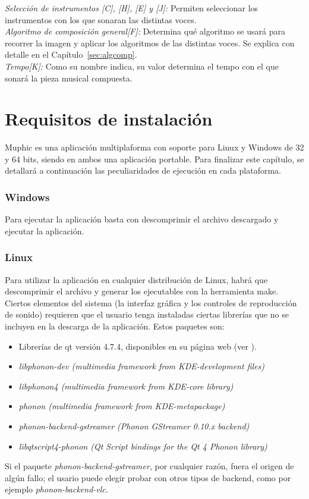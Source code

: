 		\noindent\textit{Selección de instrumentos [C], [H], [E] y [J]:} Permiten seleccionar los instrumentos con los que sonaran las distintas voces.\\

		\noindent\textit{Algoritmo de composición general[F]:} Determina qué algoritmo se usará para recorrer la imagen y aplicar los algoritmos de las distintas voces. Se explica con detalle en el Capítulo~\ref{sec:algcomp}.\\

		\noindent\textit{Tempo[K]:} Como su nombre indica, su valor determina el tempo con el que sonará la pieza musical compuesta.\\
		
	\section{Requisitos de instalación}
	
		Muphic es una aplicación multiplaforma con soporte para Linux y Windows de 32 y 64 bits, siendo en ambos una aplicación portable. Para finalizar este capítulo, se detallará a continuación las peculiaridades de ejecución en cada plataforma.
		
		\subsubsection{Windows}
		
		Para ejecutar la aplicación basta con descomprimir el archivo descargado y ejecutar la aplicación.
		
		\subsubsection{Linux}
		
		Para utilizar la aplicación en cualquier distribución de Linux, habrá que descomprimir el archivo y generar los ejecutables con la herramienta make. Ciertos elementos del sistema (la interfaz gráfica y los controles de reproducción de sonido) requieren que el usuario tenga instaladas ciertas librerías que no se incluyen en la descarga de la aplicación. Estos paquetes son:
		
		\begin{itemize}
			\item Librerías de qt versión 4.7.4, disponibles en su página web (ver \cite{qtlibs}).		
			\item \emph{libphonon-dev (multimedia framework from KDE-development files)} 
			\item \emph{libphonon4 (multimedia framework from KDE-core library)}
			\item \emph{phonon (multimedia framework from KDE-metapackage)}
			\item \emph{phonon-backend-gstreamer (Phonon GStreamer 0.10.x backend)}
			\item \emph{libqtscript4-phonon (Qt Script bindings for the Qt 4 Phonon library)}
			
		\end{itemize}
	
		Si el paquete \emph{phonon-backend-gstreamer}, por cualquier razón, fuera el origen de algún fallo; el usario puede elegir probar con otros tipos de backend, como por ejemplo \emph{phonon-backend-vlc}.
		
		
